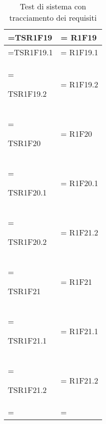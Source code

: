 \begin{xltabular}{\textwidth} {
            >{\hsize\linewidth=\hsize}X
            >{\hsize\linewidth=\hsize}X
        }
        TSR1F19 &
        R1F19
        \\ \hline

        TSR1F19.1 &
        R1F19.1
        \\ \hline

        TSR1F19.2 &
        R1F19.2
        \\ \hline

        TSR1F20 &
        R1F20
        \\ \hline

        TSR1F20.1 &
        R1F20.1
        \\ \hline

        TSR1F20.2 &
        R1F21.2 
        \\ \hline

        TSR1F21 &
        R1F21
        \\ \hline

        TSR1F21.1 &
        R1F21.1
        \\ \hline

        TSR1F21.2 &
        R1F21.2
        \\ \hline

        \caption{Test di sistema con tracciamento dei requisiti}
    \end{xltabular}

    \pagebreak